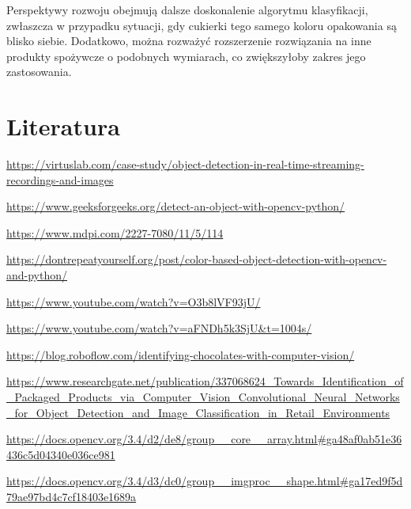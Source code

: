 \documentclass{article}
\begin{document}
Perspektywy rozwoju obejmują dalsze doskonalenie algorytmu klasyfikacji, zwłaszcza w przypadku sytuacji, gdy cukierki tego samego koloru opakowania są blisko siebie. Dodatkowo, można rozważyć rozszerzenie rozwiązania na inne produkty spożywcze o podobnych wymiarach, co zwiększyłoby zakres jego zastosowania.

\section{Literatura}
\label{Literatura}
\begin{thebibliography}{9}

\url{https://virtuslab.com/case-study/object-detection-in-real-time-streaming-recordings-and-images}

\url{https://www.geeksforgeeks.org/detect-an-object-with-opencv-python/}

\url{https://www.mdpi.com/2227-7080/11/5/114}

\url{https://dontrepeatyourself.org/post/color-based-object-detection-with-opencv-and-python/}

\url{https://www.youtube.com/watch?v=O3b8lVF93jU/}

\url{https://www.youtube.com/watch?v=aFNDh5k3SjU&t=1004s/}

\url{https://blog.roboflow.com/identifying-chocolates-with-computer-vision/}

 \url{https://www.researchgate.net/publication/337068624_Towards_Identification_of_Packaged_Products_via_Computer_Vision_Convolutional_Neural_Networks_for_Object_Detection_and_Image_Classification_in_Retail_Environments}

\url{https://docs.opencv.org/3.4/d2/de8/group__core__array.html#ga48af0ab51e36436c5d04340e036ce981}

\url{https://docs.opencv.org/3.4/d3/dc0/group__imgproc__shape.html#ga17ed9f5d79ae97bd4c7cf18403e1689a}

\end{thebibliography}
\end{document}
